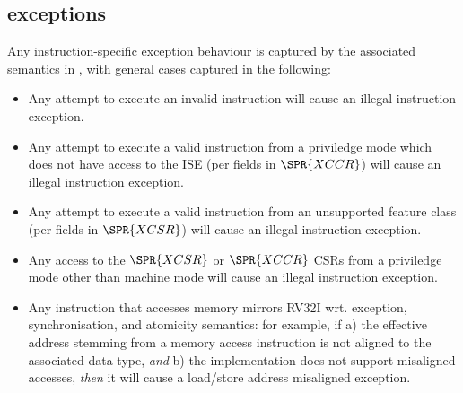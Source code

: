 \subsection{\XCID exceptions}
\label{sec:spec:exceptions}


Any instruction-specific exception behaviour is captured by the associated
semantics in , with general cases captured in
the following:

\begin{itemize}
\item Any attempt to execute an
      invalid \XCID instruction
      will cause an 
      illegal instruction exception.
\item Any attempt to execute a
        valid \XCID instruction
      from a priviledge mode which does not have access to the ISE
      (per fields in $\SPR{XCCR}$)
      will cause an
      illegal instruction exception.
\item Any attempt to execute a
        valid \XCID instruction
      from an unsupported feature class 
      (per fields in $\SPR{XCSR}$) 
      will cause an 
      illegal instruction exception.
\item Any access to the 
      $\SPR{XCSR}$ or $\SPR{XCCR}$
      CSRs from a priviledge mode other than machine mode
      will cause an 
      illegal instruction exception.
\item Any instruction that accesses memory mirrors RV32I wrt. exception,
      synchronisation, and atomicity semantics: for example, if
      a) the effective address stemming from a memory access instruction
         is not aligned to the associated data type, 
         {\em  and}
      b) the implementation does not support misaligned accesses,
         {\em then}
         it will cause a 
         load/store address misaligned exception.
\end{itemize}

